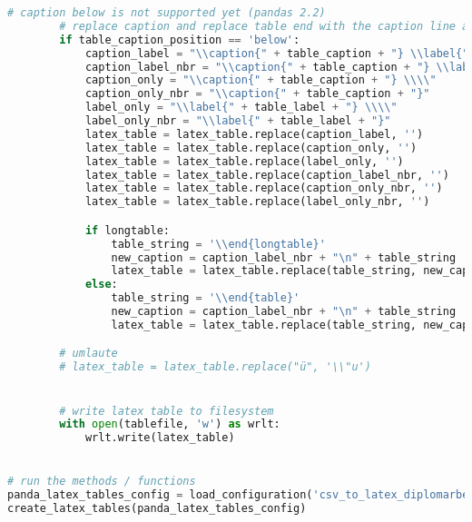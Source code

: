 \begin{lstlisting}[language=python, caption=pandas_dataframe_to_latex_table.py CSV - LaTex Tabelle,captionpos=b,label={lst:Python LaTex - pandas_dataframe_to_latex_table},breaklines=true]
        # caption below is not supported yet (pandas 2.2)
        # replace caption and replace table end with the caption line and table end
        if table_caption_position == 'below':
            caption_label = "\\caption{" + table_caption + "} \\label{" + table_label + "} \\\\"
            caption_label_nbr = "\\caption{" + table_caption + "} \\label{" + table_label + "}"
            caption_only = "\\caption{" + table_caption + "} \\\\"
            caption_only_nbr = "\\caption{" + table_caption + "}"
            label_only = "\\label{" + table_label + "} \\\\"
            label_only_nbr = "\\label{" + table_label + "}"
            latex_table = latex_table.replace(caption_label, '')
            latex_table = latex_table.replace(caption_only, '')
            latex_table = latex_table.replace(label_only, '')
            latex_table = latex_table.replace(caption_label_nbr, '')
            latex_table = latex_table.replace(caption_only_nbr, '')
            latex_table = latex_table.replace(label_only_nbr, '')

            if longtable:
                table_string = '\\end{longtable}'
                new_caption = caption_label_nbr + "\n" + table_string
                latex_table = latex_table.replace(table_string, new_caption)
            else:
                table_string = '\\end{table}'
                new_caption = caption_label_nbr + "\n" + table_string
                latex_table = latex_table.replace(table_string, new_caption)

        # umlaute
        # latex_table = latex_table.replace("ü", '\\"u')


        # write latex table to filesystem
        with open(tablefile, 'w') as wrlt:
            wrlt.write(latex_table)


# run the methods / functions
panda_latex_tables_config = load_configuration('csv_to_latex_diplomarbeit.yaml')
create_latex_tables(panda_latex_tables_config)
\end{lstlisting}